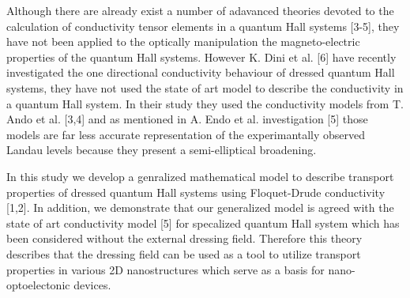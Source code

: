 Although there are already exist a number of adavanced theories devoted to the calculation of conductivity tensor elements in a quantum Hall systems [3-5], they have not been applied to the optically manipulation the magneto-electric properties of the quantum Hall systems. However K. Dini et al. [6] have recently investigated the one directional conductivity behaviour of dressed quantum Hall systems, they have not used the state of art model to describe the conductivity in a quantum Hall system. In their study they used the conductivity models from T. Ando et al. [3,4] and as mentioned in A. Endo et al. investigation [5] those models are far less accurate representation of the experimantally observed Landau levels because they present a semi-elliptical broadening.

In this study we develop a genralized mathematical model to describe transport properties of dressed quantum Hall systems using Floquet-Drude conductivity [1,2]. In addition, we demonstrate that our generalized model is agreed with the state of art conductivity model [5] for specalized quantum Hall system which has been considered without the external dressing field.  Therefore this theory describes that the dressing field can be used as a tool to utilize transport properties in various 2D nanostructures which serve as a basis for nano-optoelectonic devices.
